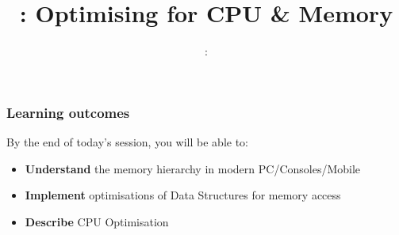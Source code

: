 \usepackage{../../beamerthemeFalmouthGamesAcademy}
\usepackage{multimedia}
\graphicspath{ {../../} }


\usepackage[normalem]{ulem}
\usepackage{wasysym}

\usepackage{pdfpages}

\usetikzlibrary{arrows,automata}




\title{\sessionnumber: Optimising for CPU \& Memory}
\subtitle{\modulecode: \moduletitle}

\frame{\titlepage} 

\begin{frame}
	\frametitle{Learning outcomes}
	By the end of today's session, you will be able to:
	\begin{itemize}
		\item \textbf{Understand} the memory hierarchy in modern PC/Consoles/Mobile
		\item \textbf{Implement} optimisations of Data Structures for memory access
		\item \textbf{Describe} CPU Optimisation
	\end{itemize}
\end{frame}



